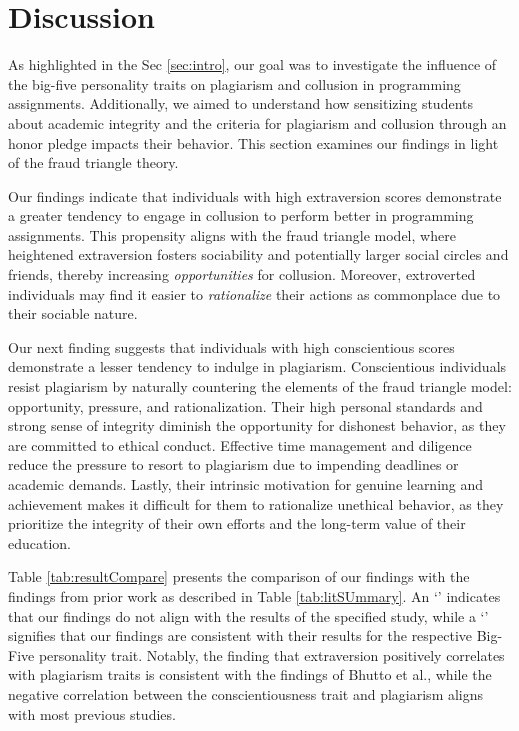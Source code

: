 \section{Discussion} \label{sec:discuss}

As highlighted in the Sec \ref{sec:intro}, our goal was to investigate the influence of the big-five personality traits on plagiarism and collusion in programming assignments. Additionally, we aimed to understand how sensitizing students about academic integrity and the criteria for plagiarism and collusion through an honor pledge impacts their behavior. This section examines our findings in light of the fraud triangle theory.

Our findings indicate that individuals with high extraversion scores demonstrate a greater tendency to engage in collusion to perform better in programming assignments. This propensity aligns with the fraud triangle model, where heightened extraversion fosters sociability and potentially larger social circles and friends, thereby increasing \emph{opportunities} for collusion. Moreover, extroverted individuals may find it easier to \emph{rationalize} their actions as commonplace due to their sociable nature. 

Our next finding suggests that individuals with high conscientious scores demonstrate a lesser tendency to indulge in plagiarism. Conscientious individuals resist plagiarism by naturally countering the elements of the fraud triangle model: opportunity, pressure, and rationalization. Their high personal standards and strong sense of integrity diminish the opportunity for dishonest behavior, as they are committed to ethical conduct. Effective time management and diligence reduce the pressure to resort to plagiarism due to impending deadlines or academic demands. Lastly, their intrinsic motivation for genuine learning and achievement makes it difficult for them to rationalize unethical behavior, as they prioritize the integrity of their own efforts and the long-term value of their education.

Table \ref{tab:resultCompare} presents the comparison of our findings with the findings from prior work as described in Table \ref{tab:litSUmmary}. An `\xmark' indicates that our findings do not align with the results of the specified study, while a `\cmark' signifies that our findings are consistent with their results for the respective Big-Five personality trait. Notably, the finding that extraversion positively correlates with plagiarism traits is consistent with the findings of Bhutto et al.\cite{Bhutto2019ACS}, while the negative correlation between the conscientiousness trait and plagiarism aligns with most previous studies. 


